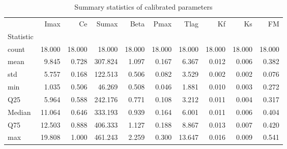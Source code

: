 \begin{table}
\caption{Summary statistics of calibrated parameters}
\label{tab:param_summary}
\begin{tabular}{lrrrrrrrrr}
\toprule
 & Imax & Ce & Sumax & Beta & Pmax & Tlag & Kf & Ks & FM \\
Statistic &  &  &  &  &  &  &  &  &  \\
\midrule
count & 18.000 & 18.000 & 18.000 & 18.000 & 18.000 & 18.000 & 18.000 & 18.000 & 18.000 \\
mean & 9.845 & 0.728 & 307.824 & 1.097 & 0.167 & 6.367 & 0.012 & 0.006 & 0.382 \\
std & 5.757 & 0.168 & 122.513 & 0.506 & 0.082 & 3.529 & 0.002 & 0.002 & 0.076 \\
min & 1.035 & 0.506 & 46.269 & 0.508 & 0.046 & 1.881 & 0.010 & 0.003 & 0.272 \\
Q25 & 5.964 & 0.588 & 242.176 & 0.771 & 0.108 & 3.212 & 0.011 & 0.004 & 0.317 \\
Median & 11.064 & 0.646 & 333.193 & 0.939 & 0.164 & 6.001 & 0.011 & 0.006 & 0.404 \\
Q75 & 12.503 & 0.888 & 406.333 & 1.127 & 0.188 & 8.867 & 0.013 & 0.007 & 0.420 \\
max & 19.808 & 1.000 & 461.243 & 2.259 & 0.300 & 13.647 & 0.016 & 0.009 & 0.541 \\
\bottomrule
\end{tabular}
\end{table}
